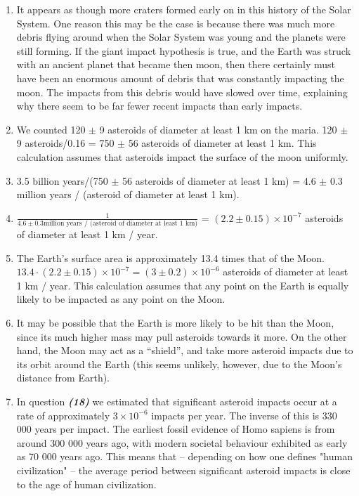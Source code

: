 \documentclass[11pt]{article}
\begin{document}
\begin{enumerate}[label={\textbf{\emph{(\arabic*)}}}]
	\item %
It appears as though more craters formed early on in this history of the Solar System.
One reason this may be the case is because there was much more debris flying around when the Solar System was young and the planets were still forming.
If the giant impact hypothesis is true, and the Earth was struck with an ancient planet that became then moon, then there certainly must have been an enormous amount of debris that was constantly impacting the moon.
The impacts from this debris would have slowed over time, explaining why there seem to be far fewer recent impacts than early impacts.

	\item %
We counted 120 $\pm$ 9 asteroids of diameter at least 1 km on the maria.
120 $\pm$ 9 asteroids/0.16 = 750 $\pm$ 56 asteroids of diameter at least 1 km.
This calculation assumes that asteroids impact the surface of the moon uniformly.

	\item %
3.5 billion years/(750 $\pm$ 56 asteroids of diameter at least 1 km) = 4.6 $\pm$ 0.3 million years / (asteroid of diameter at least 1 km).

	\item %
$\frac{1}{4.6 \pm 0.3 \textrm{million years / (asteroid of diameter at least 1 km)}}$ = $(2.2 \pm 0.15) \times 10^{-7}$ asteroids of diameter at least 1 km / year.

	\item %
The Earth's surface area is approximately 13.4 times that of the Moon.
$13.4 \cdot (2.2 \pm 0.15) \times 10^{-7} = (3 \pm 0.2) \times 10^{-6}$ asteroids of diameter at least 1 km / year.
This calculation assumes that any point on the Earth is equally likely to be impacted as any point on the Moon.

	\item %
It may be possible that the Earth is more likely to be hit than the Moon, since its much higher mass may pull asteroids towards it more.
On the other hand, the Moon may act as a ``shield'', and take more asteroid impacts due to its orbit around the Earth (this seems unlikely, however, due to the Moon's distance from Earth).
		
	\item %
In question \textbf{\emph{(18)}} we estimated that significant asteroid impacts occur at a rate of approximately $3 \times 10^{-6}$ impacts per year.
The inverse of this is 330 000 years per impact.
The earliest fossil evidence of Homo sapiens is from around 300 000 years ago, with modern societal behaviour exhibited as early as 70 000 years ago.
This means that -- depending on how one defines "human civilization" -- the average period between significant asteroid impacts is close to the age of human civilization.


\end{enumerate}
\end{document}
